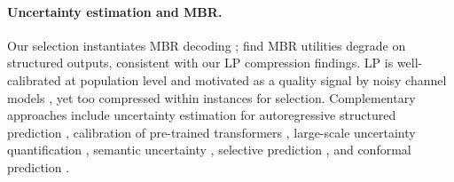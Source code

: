 \paragraph{Uncertainty estimation and MBR.}
Our selection instantiates MBR decoding \cite{eikema2022sampling}; \citet{eikema2025structured} find MBR utilities degrade on structured outputs, consistent with our LP compression findings.
LP is well-calibrated at population level \cite{kadavath2022language, tian2023calibration} and motivated as a quality signal by noisy channel models \cite{yee2019noisy}, yet too compressed within instances for selection.
Complementary approaches include uncertainty estimation for autoregressive structured prediction \cite{malinin2021uncertainty}, calibration of pre-trained transformers \cite{desai2020calibration}, large-scale uncertainty quantification \cite{xiao2022uncertainty}, semantic uncertainty \cite{kuhn2023semantic}, selective prediction \cite{geifman2017selective}, and conformal prediction \cite{angelopoulos2023conformal}.

\begin{table}[t]
\centering
\small
\caption{Novelty comparison with closest related work along six dimensions.}
\label{tab:novelty_comparison}
\end{table}

